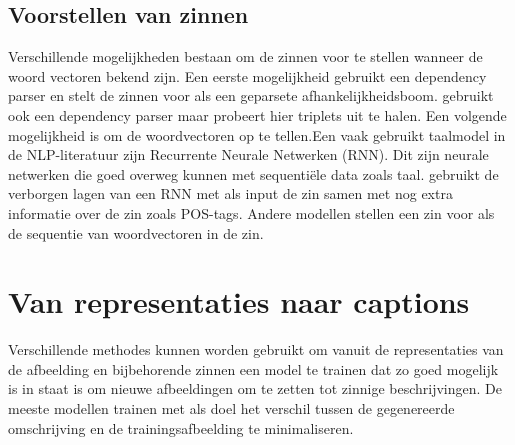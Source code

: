  \subsection{Voorstellen van zinnen}
 Verschillende mogelijkheden bestaan om de zinnen voor te stellen wanneer de woord vectoren bekend zijn. Een eerste mogelijkheid gebruikt een dependency parser en stelt de zinnen voor als een geparsete afhankelijkheidsboom.\cite{Socher}\cite{Karpathy} gebruikt ook een dependency parser maar probeert hier triplets uit te halen. Een volgende mogelijkheid is om de woordvectoren op te tellen.\cite{lebret}Een vaak gebruikt taalmodel in de NLP-literatuur zijn Recurrente Neurale Netwerken (RNN).\cite{mikolov maar de RNN} Dit zijn neurale netwerken die goed overweg kunnen met sequenti\"ele data zoals taal.\cite{Kiros} gebruikt de verborgen lagen van een RNN met als input de zin samen met nog extra informatie over de zin zoals POS-tags. Andere modellen stellen een zin voor als de sequentie van woordvectoren in de zin.
 
\section{Van representaties naar captions}
Verschillende methodes kunnen worden gebruikt om vanuit de representaties van de afbeelding en bijbehorende zinnen een model te trainen dat zo goed mogelijk is in staat is om nieuwe afbeeldingen om te zetten tot zinnige beschrijvingen. De meeste modellen trainen met als doel het verschil tussen de gegenereerde omschrijving en de trainingsafbeelding te minimaliseren.

